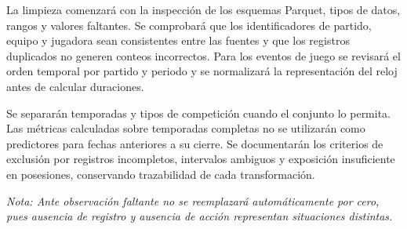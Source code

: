 La limpieza comenzará con la inspección de los esquemas Parquet, tipos de datos, rangos y valores faltantes. Se comprobará que los identificadores de partido, equipo y jugadora sean consistentes entre las fuentes y que los registros duplicados no generen conteos incorrectos. Para los eventos de juego se revisará el orden temporal por partido y periodo y se normalizará la representación del reloj antes de calcular duraciones.

Se separarán temporadas y tipos de competición cuando el conjunto lo permita. Las métricas calculadas sobre temporadas completas no se utilizarán como predictores para fechas anteriores a su cierre. Se documentarán los criterios de exclusión por registros incompletos, intervalos ambiguos y exposición insuficiente en posesiones, conservando trazabilidad de cada transformación.

\textit{Nota:
Ante observación faltante no se reemplazará automáticamente por cero, pues ausencia de registro y ausencia de acción representan situaciones distintas.}